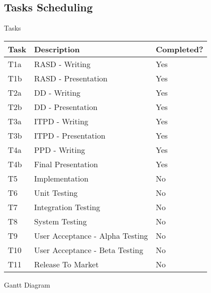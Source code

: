 \documentclass{../Common/Structure/pdf_presentation}
\begin{document}
	\subsection{Tasks Scheduling}
	\begin{frame}{Tasks}
		\begin{tabulary}{\linewidth\tymin=70pt}{Y{2cm}|Y{4cm}|Y{2.25cm}}
			\textbf{Task} & \textbf{Description} & \textbf{Completed?}\\ \hline
			T1a & RASD - Writing & Yes \\ \hline
			T1b & RASD - Presentation & Yes \\ \hline
			T2a & DD - Writing & Yes \\ \hline
			T2b & DD - Presentation & Yes \\ \hline
			T3a & ITPD - Writing & Yes \\ \hline
			T3b & ITPD - Presentation & Yes \\ \hline
			T4a & PPD - Writing & Yes \\ \hline
			T4b & Final Presentation & Yes \\ \hline
			T5 & Implementation & No \\ \hline
			T6 & Unit Testing & No \\ \hline
			T7 & Integration Testing & No \\ \hline
			T8 & System Testing & No \\ \hline
			T9 & User Acceptance - Alpha Testing & No \\ \hline
			T10 & User Acceptance - Beta Testing & No \\ \hline
			T11 & Release To Market & No \\
		\end{tabulary}
	\end{frame}
	\begin{frame}{Gantt Diagram}
	\end{frame}
\end{document}
